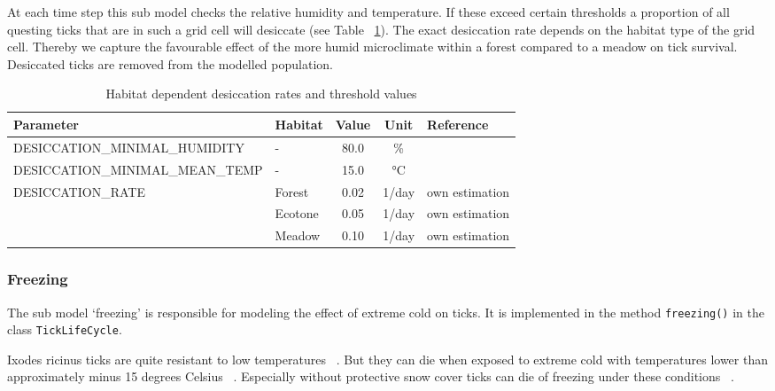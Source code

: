 \documentclass[a4paper, 11pt]{scrartcl}
\newcommand{\inlinecode}[1]{\texttt{\small #1}}
\begin{document}
At each time step this sub model checks the relative humidity and temperature. If these exceed certain thresholds a proportion of all questing ticks that are in such a grid cell will desiccate (see Table ~\ref{tab:desiccation_parameters}). The exact desiccation rate depends on the habitat type of the grid cell. Thereby we capture the favourable effect of the more humid microclimate within a forest compared to a meadow on tick survival. Desiccated ticks are removed from the modelled population.

\begin{table}[h!]
\caption{Habitat dependent desiccation rates and threshold values}
\label{tab:desiccation_parameters}
\begin{tabularx}{\textwidth}{llccl}
\toprule
\textbf{Parameter}							& \textbf{Habitat}  & \textbf{Value} & \textbf{Unit}	& \textbf{Reference} \\
\midrule
\multirow{3}{*}{\tiny{DESICCATION\_MINIMAL\_HUMIDITY}} 	& \multirow{3}{*}{-} & \multirow{3}{*}{80.0} & \multirow{3}{*}{\%} &  \cite{Medlock.2013} \\
													   	& 					 & 						 &					   &  \cite{Gray.2016}	\\
														& 					 & 						 &					   &  \cite{Hauser.2018} \\
\tiny{DESICCATION\_MINIMAL\_MEAN\_TEMP} 	& -    			 		 &   15.0  & °C  &  \cite{Ostfeld.2015} \\
\multirow{3}{*}{\tiny{DESICCATION\_RATE}}  	& Forest       			 &   0.02  & 1/day 	& own estimation \\
				 							& Ecotone 				 &   0.05  & 1/day  & own estimation \\
				 							& Meadow    			 &   0.10  & 1/day  & own estimation \\
\bottomrule
\end{tabularx}
\end{table}

\subsubsection{Freezing}
The sub model `freezing' is responsible for modeling the effect of extreme cold on ticks. It is implemented in the method \inlinecode{freezing()} in the class \inlinecode{TickLifeCycle}.

Ixodes ricinus ticks are quite resistant to low temperatures ~\parencite{Gray.2009}. But they can die when exposed to extreme cold with temperatures lower than approximately minus 15 degrees Celsius ~\parencite{Ostfeld.2015}. Especially without protective snow cover ticks can die of freezing under these conditions ~\parencite{Jore.2014}.
\end{document}
